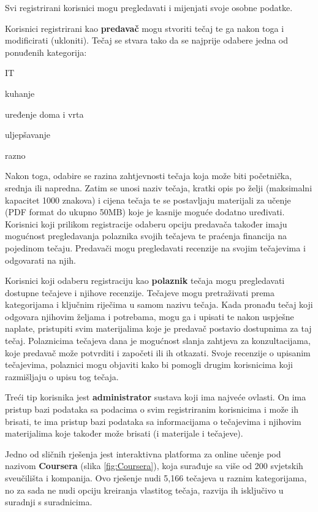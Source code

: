 	Svi registrirani korisnici mogu pregledavati i mijenjati svoje osobne podatke.
	
	Korisnici registrirani kao \textbf{predavač} mogu stvoriti tečaj te ga nakon toga i modificirati (ukloniti). Tečaj se stvara tako da se najprije odabere jedna od ponuđenih kategorija:
	\begin{packed_item}
		\item IT
		\item kuhanje
		\item uređenje doma i vrta
		\item uljepšavanje
		\item razno
	\end{packed_item}
 Nakon toga, odabire se razina zahtjevnosti tečaja koja može biti početnička, srednja ili napredna. Zatim se unosi naziv tečaja, kratki opis po želji (maksimalni kapacitet 1000 znakova) i cijena tečaja te se postavljaju materijali za učenje (PDF format do ukupno 50MB) koje je kasnije moguće dodatno uređivati. Korisnici koji prilikom registracije odaberu opciju predavača također imaju mogućnost pregledavanja polaznika svojih tečajeva te praćenja financija na pojedinom tečaju. Predavači mogu pregledavati recenzije na svojim tečajevima i odgovarati na njih.
	
	Korisnici koji odaberu registraciju kao \textbf{polaznik} tečaja mogu pregledavati dostupne tečajeve i njihove recenzije. Tečajeve mogu pretraživati prema kategorijama i ključnim riječima u samom nazivu tečaja. Kada pronađu tečaj koji odgovara njihovim željama i potrebama, mogu ga i upisati te nakon uspješne naplate, pristupiti svim materijalima koje je predavač postavio dostupnima za taj tečaj. Polaznicima tečajeva dana je mogućnost slanja zahtjeva za konzultacijama, koje predavač može potvrditi i započeti ili ih otkazati. Svoje recenzije o upisanim tečajevima, polaznici mogu objaviti kako bi pomogli drugim korisnicima koji razmišljaju o upisu tog tečaja.
	
	Treći tip korisnika jest \textbf{administrator} sustava koji ima najveće ovlasti. On ima pristup bazi podataka sa podacima o svim registriranim korisnicima i može ih brisati, te ima pristup bazi podataka sa informacijama o tečajevima i njihovim materijalima koje također može brisati (i materijale i tečajeve).
	
	Jedno od sličnih rješenja jest interaktivna platforma za online učenje pod nazivom \textbf{Coursera} (slika \ref{fig:Coursera}), koja surađuje sa više od 200 svjetskih sveučilišta i kompanija. Ovo rješenje nudi 5,166 tečajeva u raznim kategorijama, no za sada ne nudi opciju kreiranja vlastitog tečaja, razvija ih isključivo u suradnji s suradnicima.
	
